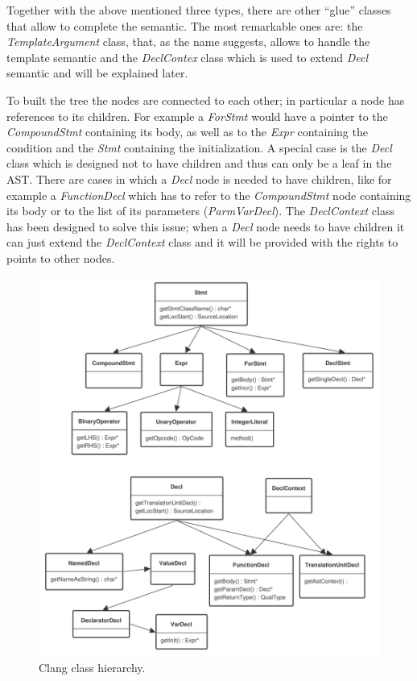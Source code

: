 \documentclass[a4paper,11pt,oneside]{book}
\begin{document}
Together with the above mentioned three types, there are other “glue” classes that allow to complete the semantic. The most remarkable ones are: the \emph{TemplateArgument} class, that, as the name suggests, allows to handle the template semantic and the \emph{DeclContex} class which is used to extend \emph{Decl} semantic and will be explained later. 

To built the tree the nodes are connected to each other; in particular a node has references to its children. For example a \emph{ForStmt} would have a pointer to the \emph{CompoundStmt} containing its body, as well as to the \emph{Expr} containing the condition and the \emph{Stmt} containing the initialization. A special case is the \emph{Decl} class which is designed not to have children and thus can only be a leaf in the AST. There are cases in which a \emph{Decl} node is needed to have children, like for example a \emph{FunctionDecl} which has to refer to the \emph{CompoundStmt} node containing its body or to the list of its parameters (\emph{ParmVarDecl}). The \emph{DeclContext} class has been designed to solve this issue; when a \emph{Decl} node needs to have children it can just extend the \emph{DeclContext} class and it will be provided with the rights to points to other nodes. 

\begin{figure}[H]
\centering
\includegraphics[scale=0.6]{clang_classes.pdf}
\caption{Clang class hierarchy.}
\end{figure}
\end{document}

